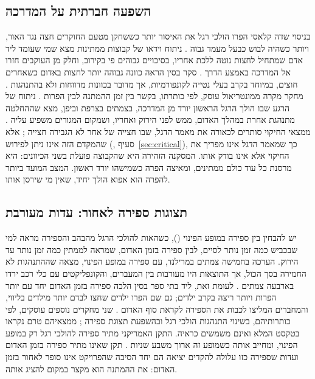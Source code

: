 \subsection{השפעה חברתית על המדרכה}
בניסוי שדה קלאסי הפרו הולכי רגל את האיסור יותר כששחקן מטעם החוקרים חצה נגד האור, ויותר כשהיה לבוש כבעל מעמד גבוה \cite{lefkowitz1955}.
ניתוח וידאו של קבוצות ממתינות מצא שמי שעומד ליד אדם שמתחיל לחצות נוטה ללכת אחריו, בסיכויים גבוהים פי  בקירוב, וחלק מן העוקבים חזרו אל המדרכה באמצע הדרך \cite{faria2010}.
סקר בסין הראה כוונה גבוהה יותר לחצות באדום כשאחרים חוצים, במיוחד בקרב בעלי נטייה לקונפורמיות, אך מדובר בכוונות מדווחות ולא בהתנהגות \cite{zhou2009}.
מחקר מקרה ממונטריאול עוסק, לפי כותרתו, בקשר בין זמן ההמתנה לבין הפרות \cite{brosseau2013}.
ניתוח של הרגע שבו הולך הרגל הראשון יורד מן המדרכה, בצמתים בצרפת וביפן, מצא שההחלטה מתנהגת אחרת במהלך האדום, ממש לפני הירוק ואחריו, ושמקום המגורים משפיע עליה \cite{pele2019}.
ממצאי החיקוי סותרים לכאורה את מאמר הדגל, שבו חצייה של אחר לא הגבירה חצייה \cite{rosenbloom2009}; אלא שהמקדם הזה אינו ניתן לפירוש (, סעיף~\ref{sec:critical}), כך שמאמר הדגל אינו מפריך את החיקוי אלא אינו בודק אותו.
המסקנה הזהירה היא שהקבוצה פועלת בשני הכיוונים: היא מרסנת כל עוד כולם ממתינים, ומאיצה הפרה כשמישהו יורד ראשון. המצב המועד ביותר להפרה הוא אפוא הולך יחיד, שאין מי שירסן אותו.

\subsection{תצוגות ספירה לאחור: עדות מעורבת}
יש להבחין בין ספירה במופע הפינוי (), כשהאות להולכי הרגל מהבהב והספירה מראה למי שבכביש כמה זמן נותר לסיים, לבין ספירה בזמן האדום, שמראה לממתין כמה זמן נותר עד הירוק.
הערכה בחמישה צמתים במרילנד, עם ספירה במופע הפינוי, מצאה שההתנהגות לא החמירה בסך הכול, אך התוצאות היו מעורבות בין המעברים, והקונפליקטים עם כלי רכב ירדו בארבעה צמתים \cite{eccles2004}.
לעומת זאת, ליד בתי ספר בסין הלכה ספירה בזמן האדום יחד עם יותר הפרות ויותר ריצה בקרב ילדים; גם שם הפרו ילדים שחצו לבדם יותר מילדים בליווי, והמחברים המליצו לכבות את הספירה לקראת סוף האדום \cite{fu2016}.
שני מחקרים נוספים עוסקים, לפי כותרותיהם, בשינוי התנהגות הולכי רגל \cite{keegan2003} ובהשפעת תצוגת ספירה \cite{lipovac2013}; ממצאיהם טרם נקראו בטקסט המלא ואינם משמשים כראיה.
התקן האמריקני מתיר ספירה להולכי רגל רק במופע הפינוי, ומחייב אותה כשמופע זה ארוך משבע שניות \cite{fhwa2025mutcd}.
תקן שאינו מתיר ספירה בזמן האדום ועדות שספירה כזו עלולה להקדים יציאה הם יחד הסיבה שהפרויקט אינו סופר לאחור בזמן האדום: את ההמתנה הוא מקצר במקום להציג אותה.

